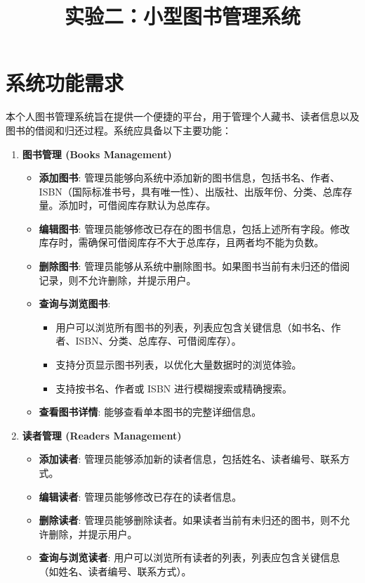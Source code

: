\documentclass[11pt, a4paper]{article}
\title{实验二：小型图书管理系统}
\date{}
\begin{document}
\maketitle

\section{系统功能需求}
本个人图书管理系统旨在提供一个便捷的平台，用于管理个人藏书、读者信息以及图书的借阅和归还过程。系统应具备以下主要功能：

\begin{enumerate}
    \item \textbf{图书管理 (Books Management)}
    \begin{itemize}
        \item \textbf{添加图书}: 管理员能够向系统中添加新的图书信息，包括书名、作者、ISBN（国际标准书号，具有唯一性）、出版社、出版年份、分类、总库存量。添加时，可借阅库存默认为总库存。
        \item \textbf{编辑图书}: 管理员能够修改已存在的图书信息，包括上述所有字段。修改库存时，需确保可借阅库存不大于总库存，且两者均不能为负数。
        \item \textbf{删除图书}: 管理员能够从系统中删除图书。如果图书当前有未归还的借阅记录，则不允许删除，并提示用户。
        \item \textbf{查询与浏览图书}:
        \begin{itemize}
            \item 用户可以浏览所有图书的列表，列表应包含关键信息（如书名、作者、ISBN、分类、总库存、可借阅库存）。
            \item 支持分页显示图书列表，以优化大量数据时的浏览体验。
            \item 支持按书名、作者或 ISBN 进行模糊搜索或精确搜索。
        \end{itemize}
        \item \textbf{查看图书详情}: 能够查看单本图书的完整详细信息。
    \end{itemize}

    \item \textbf{读者管理 (Readers Management)}
    \begin{itemize}
        \item \textbf{添加读者}: 管理员能够添加新的读者信息，包括姓名、读者编号、联系方式。
        \item \textbf{编辑读者}: 管理员能够修改已存在的读者信息。
        \item \textbf{删除读者}: 管理员能够删除读者。如果读者当前有未归还的图书，则不允许删除，并提示用户。
        \item \textbf{查询与浏览读者}: 用户可以浏览所有读者的列表，列表应包含关键信息（如姓名、读者编号、联系方式）。
    \end{itemize}


\end{enumerate}
\end{document}
